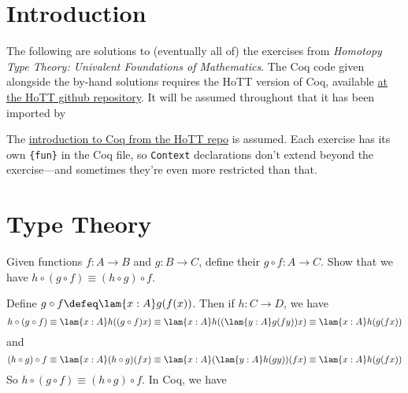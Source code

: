 \section*{Introduction}

The following are solutions to (eventually all of) the exercises from
\emph{Homotopy Type Theory: Univalent Foundations of Mathematics}.  The Coq
code given alongside the by-hand solutions requires the HoTT version of Coq,
available \href{https://github.com/HoTT}{at the HoTT github repository}.  It
will be assumed throughout that it has been imported by

\nwenddocs{}\endmoddef
{}  

\nwendcode{}The
\href{https://github.com/HoTT/book/blob/master/coq_introduction/Reading_HoTT_in_Coq.v}{introduction
to Coq from the HoTT repo} is assumed.  Each exercise has its own
\lstinline|{fun}| in the Coq file, so \lstinline|Context| declarations don't
extend beyond the exercise---and sometimes they're even more restricted than
that.

\section{Type Theory}

  Given functions $f:A\to B$ and $g:B\to C$, define
their  $g \circ f : A \to C$.  Show that we have $h \circ (g
\circ f) \equiv (h \circ g) \circ f$.

\soln
Define $g \circ f \defeq \lam{x:A}g(f(x))$.  Then if $h:C \to D$, we
have
\[
  h \circ (g \circ f) 
  \equiv \lam{x:A}h((g \circ f)x)
  \equiv \lam{x:A}h((\lam{y:A}g(fy))x)
  \equiv \lam{x:A}h(g(fx))
\]
and
\[
  (h \circ g) \circ f 
  \equiv \lam{x:A}(h \circ g)(fx)
  \equiv \lam{x:A}(\lam{y:A}h(gy))(fx)
  \equiv \lam{x:A}h(g(fx))
\]
So $h \circ (g \circ f) \equiv (h \circ g) \circ f$.  In Coq, we have

\nwenddocs{}\plusendmoddef
{} 

               
         

